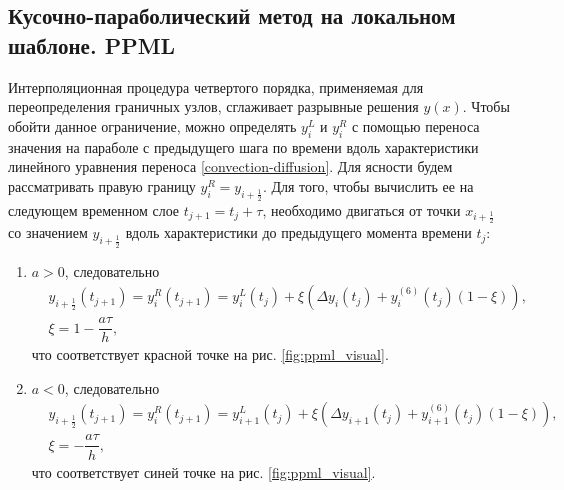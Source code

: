 \documentclass[12pt,a4paper]{article}
\newcommand{\picref}[1]{рис. \ref{#1}}
\newcommand{\half}{\frac{1}{2}}
\begin{document}
    \subsection{Кусочно-параболический метод на локальном шаблоне. PPML}

    Интерполяционная процедура четвертого порядка, применяемая для переопределения граничных узлов, сглаживает разрывные решения $y(x)$. Чтобы обойти данное ограничение, можно определять $ y_i^L $ и $ y_i^R $ с помощью переноса значения на параболе с предыдущего шага по времени вдоль характеристики линейного уравнения переноса \eqref{convection-diffusion}. Для ясности  будем рассматривать правую границу $y_i^R = y_{i+\half}$. Для того, чтобы вычислить ее на следующем временном слое $ t_{j+1} = t_j + \tau$, необходимо двигаться от точки $ x_{i+\half} $ со значением $ y_{i+\half} $ вдоль характеристики до предыдущего момента времени $ t_j $:
    \begin{enumerate}
        \item $ a > 0 $, следовательно
        \begin{equation}
            \label{ppml_boundary}
            \begin{split}
                &y_{i+\half}(t_{j+1}) = y_i^R(t_{j+1}) = y_i^L(t_j) + \xi(\Delta y_i(t_j) + y_i^{(6)}(t_j)(1-\xi)), \\[0.7em]
                &\xi = 1 -  \dfrac{a \tau}{h},
            \end{split}
        \end{equation}
        \noindent что соответствует красной точке на \picref{fig:ppml_visual}.

        \item $ a < 0 $, следовательно
        \[
            \begin{split}
                &y_{i+\half}(t_{j+1}) = y_i^R(t_{j+1}) = y_{i+1}^L(t_j) + \xi(\Delta y_{i+1}(t_j) + y_{i+1}^{(6)}(t_j)(1-\xi)), \\[0.7em]
                &\xi = -\dfrac{a \tau}{h},
            \end{split}  
        \]
        \noindent что соответствует синей точке на \picref{fig:ppml_visual}.
    \end{enumerate}
\end{document}
